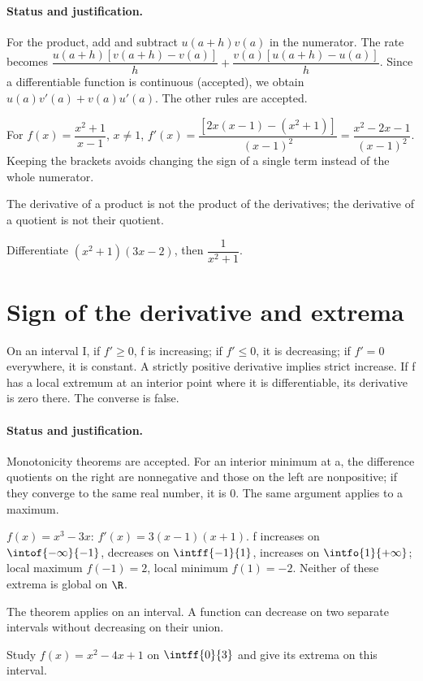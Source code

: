 \paragraph{Status and justification.} For the product, add and subtract $u(a+h)v(a)$ in the numerator. The rate becomes $\dfrac{u(a+h)[v(a+h)-v(a)]}{h}+\dfrac{v(a)[u(a+h)-u(a)]}{h}$. Since a differentiable function is continuous (accepted), we obtain $u(a)v\prime(a)+v(a)u\prime(a)$. The other rules are accepted.
\begin{example}For $f(x)=\dfrac{x^2+1}{x-1}$, $x\ne1$, $f\prime (x)=\dfrac{[2x(x-1)-(x^2+1)]}{(x-1)^2}=\dfrac{x^2-2x-1}{(x-1)^2}$. Keeping the brackets avoids changing the sign of a single term instead of the whole numerator.\end{example}\label{C06-EX2}
\begin{pitfall}The derivative of a product is not the product of the derivatives; the derivative of a quotient is not their quotient.\end{pitfall}
\begin{application}Differentiate $(x^2+1)(3x-2)$, then $\dfrac{1}{x^2+1}$.\end{application}\label{C06-AP2}
\section{Sign of the derivative and extrema}\label{C06-U3}
\begin{keypoint}
On an interval I, if $f\prime\geq0$, f is increasing; if $f\prime\leq0$, it is decreasing; if $f\prime=0$ everywhere, it is constant. A strictly positive derivative implies strict increase. If f has a local extremum at an interior point where it is differentiable, its derivative is zero there. The converse is false.
\end{keypoint}
\paragraph{Status and justification.} Monotonicity theorems are accepted. For an interior minimum at a, the difference quotients on the right are nonnegative and those on the left are nonpositive; if they converge to the same real number, it is 0. The same argument applies to a maximum.
\begin{example}$f(x)=x^3-3x$: $f\prime(x)=3(x-1)(x+1)$. f increases on $\intof{-\infty}{-1}$, decreases on $\intff{-1}{1}$, increases on $\intfo{1}{+\infty}$; local maximum $f(-1)=2$, local minimum $f(1)=-2$. Neither of these extrema is global on $\R$.\end{example}\label{C06-EX3}
\begin{pitfall}The theorem applies on an interval. A function can decrease on two separate intervals without decreasing on their union.\end{pitfall}
\begin{application}Study $f(x)=x^2-4x+1$ on $\intff{0}{3}$ and give its extrema on this interval.\end{application}\label{C06-AP3}
